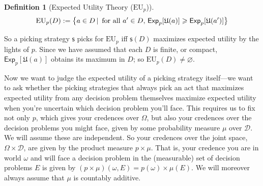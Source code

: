 \documentclass[a4paper,final]{article}
\newtheorem{definition}[theorem]{Definition}
\newcommand\A{\mathcal{A}}
\newcommand\Exp{\mathsf{Exp}}
\newcommand\EU{\mathrm{EU}}
\newcommand\U{\mathfrak{U}} %
\newcommand{\D}{\mathcal{D}}
\newcommand\s{\mathsf{s}}
\newcommand{\todoold}[2][]{\todo[backgroundcolor=white,bordercolor=orange!10,linecolor=gray!10, #1,caption={},textcolor=gray]{Pre-rev: #2}}
\newcommand{\todooldinfo}[2][]{\todoold[#1]{#2}}
\newcommand\SetDelimiter[1][]{
	\nonscript\,#1\vert \allowbreak \nonscript\,\mathopen{}}
\providecommand\given{\SetDelimiter}
\renewcommand{\emptyset}{\varnothing}
\renewcommand{\geq}{\geqslant}
\newenvironment{CCM rewritten}
{\begingroup\color{blue}} %
{\endgroup}              %
\begin{document}
\begin{definition}[Expected Utility Theory ($\EU_p$)]\label{def:EU}
	\[\EU_p(D):=\left \{a\in D\given \text{ for all $a'\in D$, }\Exp_p[\U(a)]\geq \Exp_p[\U(a')]\right \}\]
\end{definition}


So a picking strategy $\s$ picks for $\EU_p$ iff $\s(D)$ maximizes expected utility by the lights of $p$.
Since we have assumed that each $D$ is finite, or compact, $\Exp_p[\U(a)]$ obtains its maximum in $D$; so $\EU_p(D)\neq\emptyset$. 

Now we want to judge the expected utility of a picking strategy itself---we want to ask whether the picking strategies that always pick an act that maximizes expected utility from any decision problem themselves maximize expected utility when you're uncertain which decision problem you'll face. This requires us to fix not only $p$, which gives your credences over $\Omega$, but also your credences over the decision problems you might face, given by some probability measure $\mu$ over $\D$. We will assume these are independent. %
{So your credences over the joint space, $\Omega\times\D$, are given by the product measure $p\times\mu$. That is, your credence you are in world $\omega$ and will face a decision problem in the (measurable) set of decision problems $E$ is given by $(p\times\mu)(\omega,E)=p(\omega)\times\mu(E)$.} 
We will moreover always assume that $\mu$ is countably additive. 
\end{document}
